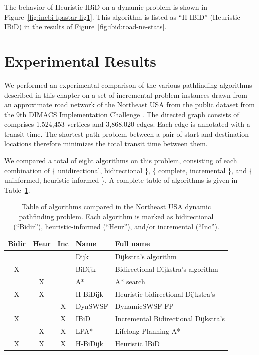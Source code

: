 The behavior of Heuristic IBiD on a dynamic problem is shown
in Figure~\ref{fig:incbi-lpastar-fig1}.
This algorithm is listed as ``H-IBiD'' (Heuristic IBiD)
in the results of Figure~\ref{fig:ibid:road-ne-stats}.

\section{Experimental Results}
\label{sec:ibid:experiments}

We performed an experimental comparison of the various pathfinding
algorithms described in this chapter
on a set of incremental problem instances drawn from
an approximate road network of the Northeast USA
from the public dataset from the 9th DIMACS
Implementation Challenge \citep{demetrescuetal2006dimacs9}.
The directed graph consists of comprises 1,524,453 vertices
and 3,868,020 edges.
Each edge is annotated with a transit time.
The shortest path problem between a pair of start and destination
locations therefore minimizes the total transit time between them.

We compared a total of eight algorithms on this problem,
consisting of each combination of
\{ unidirectional, bidirectional \},
\{ complete, incremental \},
and
\{ uninformed, heuristic informed \}.
A complete table of algorithms is given
in Table~\ref{table:ibid:experiments-algorithms}.

\begin{table}
   \centering
   \begin{tabular}{cccll}
      \toprule
      Bidir & Heur & Inc & Name & Full name \\
      \midrule
        &   &   & Dijk & Dijkstra's algorithm \\
      X &   &   & BiDijk & Bidirectional Dijkstra's algorithm \\
        & X &   & A* & A* search \\
      X & X &   & H-BiDijk & Heuristic bidirectional Dijkstra's \\
        &   & X & DynSWSF & DynamicSWSF-FP \\
      X &   & X & IBiD & Incremental Bidirectional Dijkstra's \\
        & X & X & LPA* & Lifelong Planning A* \\
      X & X & X & H-BiDijk & Heuristic IBiD \\
      \bottomrule
   \end{tabular}
   \caption{Table of algorithms compared in the Northeast USA
      dynamic pathfinding problem.
      Each algorithm is marked as bidirectional (``Bidir''),
      heuristic-informed (``Heur''),
      and/or incremental (``Inc'').}
   \label{table:ibid:experiments-algorithms}
\end{table}

